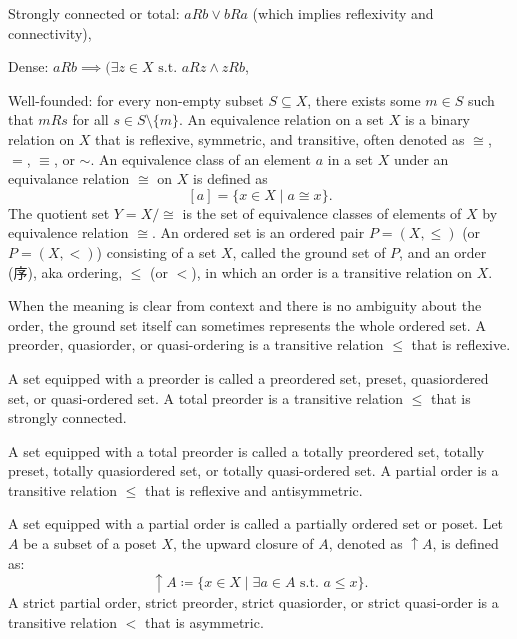 \documentclass[a4paper,12pt]{article}
\begin{document}
\item Strongly connected or total: $aRb\lor bRa$ (which implies reflexivity and connectivity),
\item Dense: $aRb\implies (\exists z\in X\text{\ s.t.\ }aRz\land zRb$,
\item Well-founded: for every non-empty subset $S\subseteq X$, there exists some $m\in S$ such that $mRs$ for all $s\in S\setminus\{m\}$.
\eit
{}
An equivalence relation on a set $X$ is a binary relation on $X$ that is reflexive, symmetric, and transitive, often denoted as $\cong$, $=$, $\equiv$, or $\sim$.
An equivalence class of an element $a$ in a set $X$ under an equivalance relation $\cong$ on $X$ is defined as
\[[a]=\{x\in X\mid a\cong x\}.\]
The quotient set $Y=X/\cong$ is the set of equivalence classes of elements of $X$ by equivalence relation $\cong$. 
An ordered set is an ordered pair $P=(X,\leq )$ (or $P=(X,<)$) consisting of a set $X$, called the ground set of $P$, and an order (序), aka ordering, $\leq$ (or $<$), in which an order is a transitive relation on $X$.

When the meaning is clear from context and there is no ambiguity about the order, the ground set itself can sometimes represents the whole ordered set.
A preorder, quasiorder, or quasi-ordering is a transitive relation $\leq$ that is reflexive. 

A set equipped with a preorder is called a preordered set, preset, quasiordered set, or quasi-ordered set.
A total preorder is a transitive relation $\leq$ that is strongly connected.

A set equipped with a total preorder is called a totally preordered set, totally preset, totally quasiordered set, or totally quasi-ordered set.
A partial order is a transitive relation $\leq$ that is reflexive and antisymmetric.

A set equipped with a partial order is called a partially ordered set or poset.
Let $A$ be a subset of a poset $X$, the upward closure of $A$, denoted as $\uparrow A$, is defined as:
\[\uparrow A \coloneq \{ x \in X \mid\exists a \in A \text{\ s.t.\ } a \leq x \}.\]
A strict partial order, strict preorder, strict quasiorder, or strict quasi-order is a transitive relation $<$ that is asymmetric.
\end{document}
